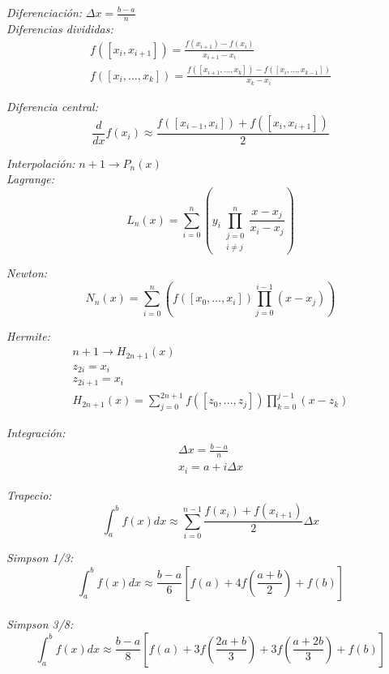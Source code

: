 \documentclass[12pt]{article}
\begin{document}
  \textit{Diferenciación:} $ \Delta x = \frac{b-a}{n}$\\
  
  \textit{Diferencias divididas:}
  \begin{eqnarray*}
  f([x_i, x_{i+1}]) = \frac{f(x_{i+1})-f(x_i)}{x_{i+1}-x_i}\\
  f([x_i, \ldots, x_k]) = \frac{f([x_{i+1}, \ldots, x_k]) - f([x_i, \ldots, x_{k-1}])}{x_k - x_i}
  \end{eqnarray*}

  \textit{Diferencia central:} $$\frac{d}{dx}f(x_i) \approx \frac{f([x_{i-1}, x_i])+f([x_{i}, x_{i+1}])}{2} $$
  
  \textit{Interpolación:} $n+1 \rightarrow P_n(x)$\\
  
  \textit{Lagrange:} $$L_n(x) = \sum_{i=0}^n \left(y_i\prod_{\substack{j=0 \\ i \neq j}}^n \frac{x-x_j}{x_i - x_j}\right)$$
  
  \textit{Newton:} $$N_n(x) = \sum_{i=0}^n \left(f([x_0, \ldots, x_i]) \prod_{j=0}^{i-1}(x-x_j)\right)$$
  
  \textit{Hermite:}
  \begin{eqnarray*}
  n+1 \rightarrow H_{2n+1}(x)\\
  z_{2i} = x_i\\
  z_{2i+1} = x_i\\
  H_{2n+1}(x) = \sum_{j=0}^{2n+1}f([z_0, \ldots, z_j])\prod_{k=0}^{j-1}(x - z_k)
  \end{eqnarray*}
  
  \textit{Integración:}
  \begin{eqnarray*}
   \Delta x = \frac{b-a}{n}\\
   x_i = a + i \Delta x  
  \end{eqnarray*}
  
  \textit{Trapecio:}
  $$\int_a^b f(x)dx \approx \sum_{i=0}^{n-1} \frac{f(x_i) + f(x_{i+1})}{2}\Delta x$$

  \textit{Simpson 1/3:}
  $$ \int_a^b f(x)dx \approx \frac{b-a}{6} \left[f(a) + 4f\left(\frac{a+b}{2} \right) + f(b) \right] $$\\
  
  \textit{Simpson 3/8:}
  $$ \int_a^b f(x)dx \approx \frac{b-a}{8} \left[f(a) + 3f\left(\frac{2a+b}{3}\right) + 3f\left(\frac{a+2b}{3}\right) + f(b) \right] $$
  
\end{document}
